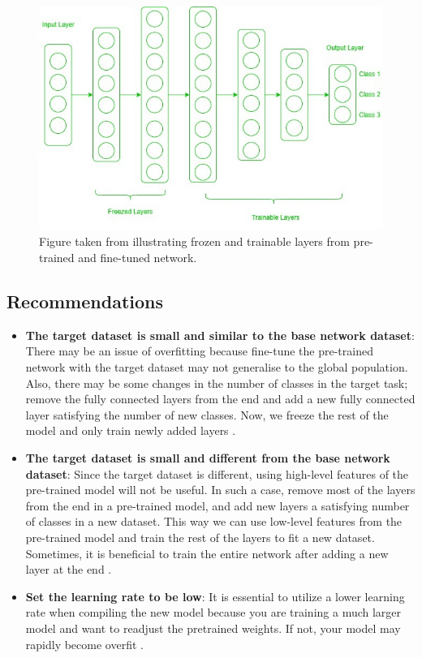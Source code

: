 \documentclass[11pt]{article}
\begin{document}
\begin{figure}[H]
    \centering
    \includegraphics[width=0.7\linewidth]{images/Frozen-layers.jpg}
    \caption{Figure taken from \cite{geeks-transfer-learning} illustrating frozen and trainable layers from pre-trained and fine-tuned network.}
    \label{fig:frozen-layers}
\end{figure}

\subsection{Recommendations}

\begin{itemize}
    \item \textbf{The target dataset is small and similar to the base network dataset}: There may be an issue of overfitting because fine-tune the pre-trained network with the target dataset may not generalise to the global population. Also, there may be some changes in the number of classes in the target task; remove the fully connected layers from the end and add a new fully connected layer satisfying the number of new classes. Now, we freeze the rest of the model and only train newly added layers \cite{geeks-transfer-learning}.
    \item \textbf{The target dataset is small and different from the base network dataset}: Since the target dataset is different, using high-level features of the pre-trained model will not be useful. In such a case, remove most of the layers from the end in a pre-trained model, and add new layers a satisfying number of classes in a new dataset. This way we can use low-level features from the pre-trained model and train the rest of the layers to fit a new dataset. Sometimes, it is beneficial to train the entire network after adding a new layer at the end \cite{geeks-transfer-learning}.
    \item \textbf{Set the learning rate to be low}: It is essential to utilize a lower learning rate when compiling the new model because you are training a much larger model and want to readjust the pretrained weights. If not, your model may rapidly become overfit \cite{geeks-transfer-learning}.
\end{itemize}

\printbibliography
\end{document}
